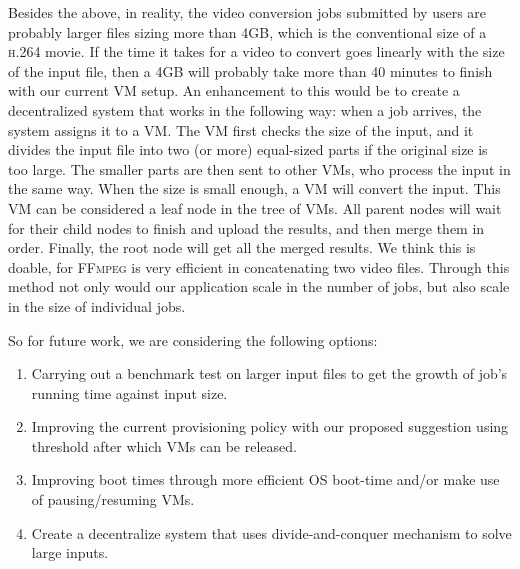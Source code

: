 Besides the above, in reality, the video conversion jobs submitted by
users are probably larger files sizing more than 4GB, which is the
conventional size of a \textsc{h.264} movie. If the time it takes for
a video to convert goes linearly with the size of the input file, then
a 4GB will probably take more than 40 minutes to finish with our
current VM setup. An enhancement to this would be to create a
decentralized system that works in the following way: when a job arrives,
the system assigns it to a VM. The VM first checks the size of the
input, and it divides the input file into two (or more) equal-sized
parts if the original size is too large.  The smaller parts are then
sent to other VMs, who process the input in the same way. When the
size is small enough, a VM will convert the input. This VM can be
considered a leaf node in the tree of VMs. All parent nodes will wait
for their child nodes to finish and upload the results, and then merge
them in order. Finally, the root node will get all the merged
results. We think this is doable, for \textsc{FFmpeg} is very efficient
in concatenating two video files. Through this method not only would
our application scale in the number of jobs, but also scale in the
size of individual jobs.

So for future work, we are considering the following options:
\begin{enumerate}
\item Carrying out a benchmark test on larger input files to get the
  growth of job's running time against input size.

\item Improving the current provisioning policy with our proposed
  suggestion using threshold after which VMs can be released.
\item Improving boot times through more efficient OS boot-time and/or
  make use of pausing/resuming VMs.

\item Create a decentralize system that uses divide-and-conquer
  mechanism to solve large inputs.

\end{enumerate}




